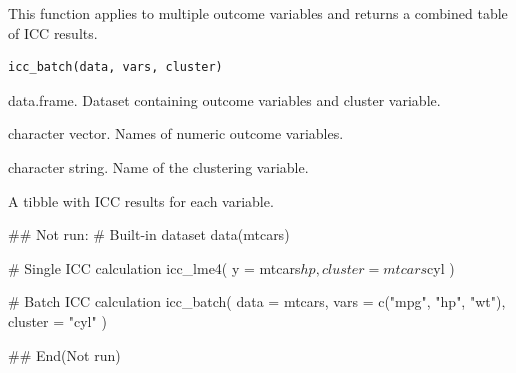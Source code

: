 \documentclass[a4paper]{book}
\begin{document}
%
\begin{Description}
This function applies  to multiple outcome variables
and returns a combined table of ICC results.
\end{Description}
%
\begin{Usage}
\begin{verbatim}
icc_batch(data, vars, cluster)
\end{verbatim}
\end{Usage}
%
\begin{Arguments}
\begin{ldescription}
\item[\code{data}] data.frame. Dataset containing outcome variables and cluster variable.

\item[\code{vars}] character vector. Names of numeric outcome variables.

\item[\code{cluster}] character string. Name of the clustering variable.
\end{ldescription}
\end{Arguments}
%
\begin{Value}
A tibble with ICC results for each variable.
\end{Value}
%
\begin{Examples}
\begin{ExampleCode}
\#\# Not run: 
# Built-in dataset
data(mtcars)

# Single ICC calculation
icc_lme4(
  y = mtcars$hp,
  cluster = mtcars$cyl
)

# Batch ICC calculation
icc_batch(
  data = mtcars,
  vars = c("mpg", "hp", "wt"),
  cluster = "cyl"
)

## End(Not run)
\end{ExampleCode}
\end{Examples}
\end{document}
